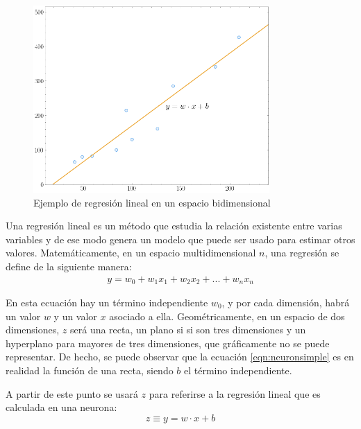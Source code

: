 \begin{figure}[H]
    \centering
    \includegraphics[width=9cm]{images/state-of-art/regression/regression.png}
    \caption{Ejemplo de regresión lineal en un espacio bidimensional}
    \label{fig:regression}
\end{figure}

Una regresión lineal es un método que estudia la relación existente entre varias variables y de ese modo genera un modelo que puede ser usado para estimar otros valores. Matemáticamente, en un espacio multidimensional $n$, una regresión se define de la siguiente manera:
\begin{eqnarray}
  y = w_0 + w_1x_1 + w_2x_2 + ... + w_nx_n
  \label{linealregression}
\end{eqnarray}


En esta ecuación hay un término independiente $w_0$, y por cada dimensión, habrá un valor $w$ y un valor $x$ asociado a ella. Geométricamente, en un espacio de dos dimensiones, $z$ será una recta, un plano si si son tres dimensiones y un hyperplano para mayores de tres dimensiones, que gráficamente no se puede representar. De hecho, se puede observar que la ecuación \ref{eqn:neuronsimple} es en realidad la función de una recta, siendo $b$ el término independiente. 
\newline

A partir de este punto se usará $z$ para referirse a la regresión lineal que es calculada en una neurona:
\begin{equation}
  z \equiv y = w \cdot x + b
  \label{eqn:z_equation_init}
\end{equation}






